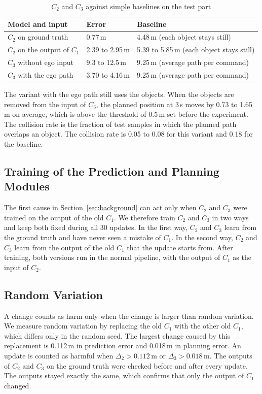 \documentclass[11pt,a4paper]{article}
\begin{document}
\begin{table}[h!]
\centering
\caption{$C_2$ and $C_3$ against simple baselines on the test part}
\label{tab:validity}
\small
\renewcommand{\arraystretch}{1.25}
\begin{tabular}{@{}L{5.4cm}L{3.3cm}L{4.6cm}@{}}
\toprule
\textbf{Model and input} & \textbf{Error} & \textbf{Baseline} \\
\midrule
$C_2$ on ground truth & 0.77\,m & 4.48\,m (each object stays still) \\
$C_2$ on the output of $C_1$ & 2.39 to 2.95\,m & 5.39 to 5.85\,m (each object stays still) \\
$C_3$ without ego input & 9.3 to 12.5\,m & 9.25\,m (average path per command) \\
$C_3$ with the ego path & 3.70 to 4.16\,m & 9.25\,m (average path per command) \\
\bottomrule
\end{tabular}
\end{table}

The variant with the ego path still uses the objects. When the objects are
removed from the input of $C_3$, the planned position at 3\,s moves by 0.73 to
1.65\,m on average, which is above the threshold of 0.5\,m set before the
experiment. The collision rate is the fraction of test samples in which the planned path
overlaps an object. The collision rate is 0.05 to 0.08 for this variant and
0.18 for the baseline.

\subsection{Training of the Prediction and Planning Modules}

The first cause in Section~\ref{sec:background} can act only when $C_2$ and
$C_3$ were trained on the output of the old $C_1$. We therefore train $C_2$
and $C_3$ in two ways and keep both fixed during all 30 updates. In the first
way, $C_2$ and $C_3$ learn from the ground truth and have never seen a
mistake of $C_1$. In the second way, $C_2$ and $C_3$ learn from the output of
the old $C_1$ that the update starts from. After training, both versions run
in the normal pipeline, with the output of $C_1$ as the input of $C_2$.

\subsection{Random Variation}

A change counts as harm only when the change is larger than random variation.
We measure random variation by replacing the old $C_1$ with the other old
$C_1$, which differs only in the random seed. The largest change caused by
this replacement is 0.112\,m in prediction error and 0.018\,m in planning
error. An update is counted as harmful when $\Delta_2 > 0.112$\,m or
$\Delta_3 > 0.018$\,m. The outputs of $C_2$ and $C_3$ on the ground truth were
checked before and after every update. The outputs stayed exactly the same,
which confirms that only the output of $C_1$ changed.
\end{document}
